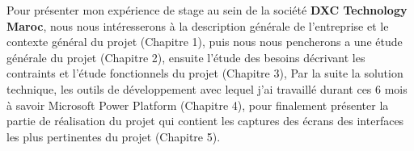 Pour présenter mon expérience de stage au sein de la société \textbf{DXC Technology Maroc}, nous nous intéresserons à la description générale de l’entreprise et le contexte général du projet (Chapitre 1), puis nous nous pencherons a une étude générale du projet (Chapitre 2), ensuite l’étude des besoins décrivant les contraints et l’étude fonctionnels du projet (Chapitre 3), Par la suite la solution technique, les outils de développement avec lequel j’ai travaillé durant ces 6 mois à savoir Microsoft Power Platform (Chapitre 4), pour finalement présenter la partie de réalisation du projet qui contient les captures des écrans des interfaces les plus pertinentes du projet (Chapitre 5).


\newpage